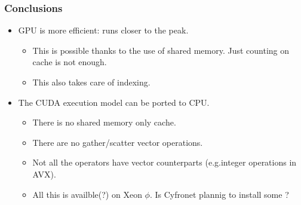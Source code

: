 \documentclass{beamer}
\begin{document}
\begin{frame}
\frametitle{Conclusions}
\begin{itemize}
\item GPU is more efficient: runs closer to the peak.
\begin{itemize}
\item This is possible thanks to the use of shared memory. Just
  counting on cache is not enough.
\item This also takes care of indexing.
\end{itemize}
\item The CUDA execution model can be ported to CPU.
\begin{itemize}
\item There is no shared memory only cache.
\item There are no gather/scatter vector operations.
\item Not all the  operators have vector counterparts (e.g.integer operations in AVX).
\item All this is availble(?) on Xeon $\phi$. Is Cyfronet plannig to install some ? 
\end{itemize}
\end{itemize}
\end{frame}
\end{document}
